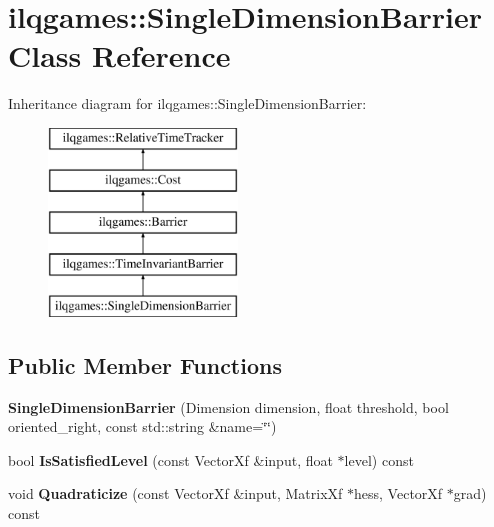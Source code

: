 \hypertarget{classilqgames_1_1_single_dimension_barrier}{}\section{ilqgames\+:\+:Single\+Dimension\+Barrier Class Reference}
\label{classilqgames_1_1_single_dimension_barrier}
Inheritance diagram for ilqgames\+:\+:Single\+Dimension\+Barrier\+:\begin{figure}[H]
\begin{center}
\leavevmode
\includegraphics[height=5.000000cm]{classilqgames_1_1_single_dimension_barrier}
\end{center}
\end{figure}
\subsection*{Public Member Functions}
\begin{DoxyCompactItemize}
\item 
{\bfseries Single\+Dimension\+Barrier} (Dimension dimension, float threshold, bool oriented\+\_\+right, const std\+::string \&name=\char`\"{}\char`\"{})\hypertarget{classilqgames_1_1_single_dimension_barrier_ab997882378e64c929e6cc81b1636c78e}{}\label{classilqgames_1_1_single_dimension_barrier_ab997882378e64c929e6cc81b1636c78e}

\item 
bool {\bfseries Is\+Satisfied\+Level} (const Vector\+Xf \&input, float $\ast$level) const \hypertarget{classilqgames_1_1_single_dimension_barrier_a70070e36bc9097fb3f712711e74510b6}{}\label{classilqgames_1_1_single_dimension_barrier_a70070e36bc9097fb3f712711e74510b6}

\item 
void {\bfseries Quadraticize} (const Vector\+Xf \&input, Matrix\+Xf $\ast$hess, Vector\+Xf $\ast$grad) const \hypertarget{classilqgames_1_1_single_dimension_barrier_a0235f1cceb8bf292962e28782875f326}{}\label{classilqgames_1_1_single_dimension_barrier_a0235f1cceb8bf292962e28782875f326}

\end{DoxyCompactItemize}
